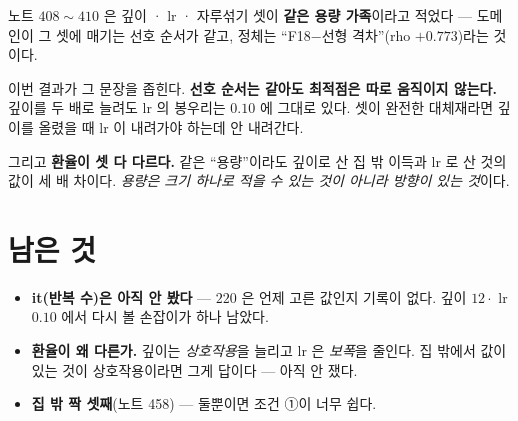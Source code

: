 \documentclass[11pt]{article}
\begin{document}
노트 $408 \sim 410$ 은 깊이 · lr · 자루섞기 셋이 \textbf{같은 용량
가족}이라고 적었다 --- 도메인이 그 셋에 매기는 선호 순서가 같고,
정체는 ``F18$-$선형 격차''(rho $+0.773$)라는 것이다.

이번 결과가 그 문장을 좁힌다. \textbf{선호 순서는 같아도 최적점은 따로
움직이지 않는다.} 깊이를 두 배로 늘려도 lr 의 봉우리는 $0.10$ 에
그대로 있다. 셋이 완전한 대체재라면 깊이를 올렸을 때 lr 이 내려가야
하는데 안 내려간다.

그리고 \textbf{환율이 셋 다 다르다.} 같은 ``용량''이라도 깊이로 산
집 밖 이득과 lr 로 산 것의 값이 세 배 차이다. \emph{용량은 크기 하나로
적을 수 있는 것이 아니라 방향이 있는 것}이다.

\section*{남은 것}

\begin{itemize}
\item \textbf{it(반복 수)은 아직 안 봤다} --- $220$ 은 언제 고른 값인지
기록이 없다. 깊이 $12 \cdot$ lr $0.10$ 에서 다시 볼 손잡이가 하나 남았다.
\item \textbf{환율이 왜 다른가.} 깊이는 \emph{상호작용}을 늘리고 lr 은
\emph{보폭}을 줄인다. 집 밖에서 값이 있는 것이 상호작용이라면 그게 답이다
--- 아직 안 쟀다.
\item \textbf{집 밖 짝 셋째}(노트 458) --- 둘뿐이면 조건 ①이 너무 쉽다.
\end{itemize}
\end{document}
